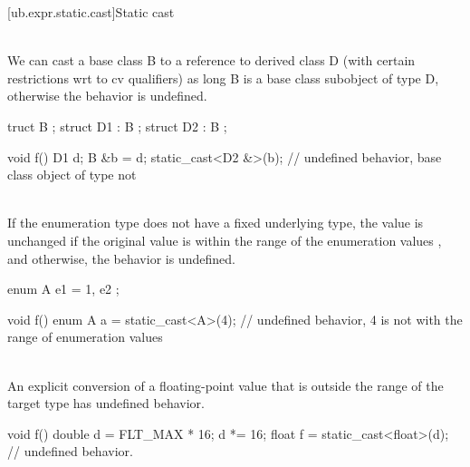 [ub.expr.static.cast]{Static cast}

\pnum
{} \\
We can cast a base class B to a reference to derived class D (with certain restrictions wrt to cv qualifiers)
as long B is a base class subobject of type D, otherwise the behavior is undefined.

\pnum
\begin{example}
\begin{codeblock}
truct B {};
struct D1 : B {};
struct D2 : B {};

void f() {
  D1 d;
  B &b = d;
  static_cast<D2 &>(b); // undefined behavior, base class object of type  not 
}
\end{codeblock}
\end{example}

\pnum
{} \\
If the enumeration type does not have a fixed underlying
type, the value is unchanged if the original value is within the range of the enumeration values , and
otherwise, the behavior is undefined.

\pnum
\begin{example}
\begin{codeblock}
enum A { e1 = 1, e2 };

void f() {
  enum A a = static_cast<A>(4); // undefined behavior, 4 is not with the range of enumeration values
}
\end{codeblock}
\end{example}

\pnum
{} \\
An explicit conversion of a
floating-point value that is outside the range of the
target type has undefined behavior.

\pnum
\begin{example}
\begin{codeblock}
void f() {
  double d = FLT_MAX * 16;
  d *= 16;
  float f = static_cast<float>(d);  // undefined behavior.
}
\end{codeblock}
\end{example}


\pnum
\begin{example}
\begin{codeblock}

\end{codeblock}
\end{example}

